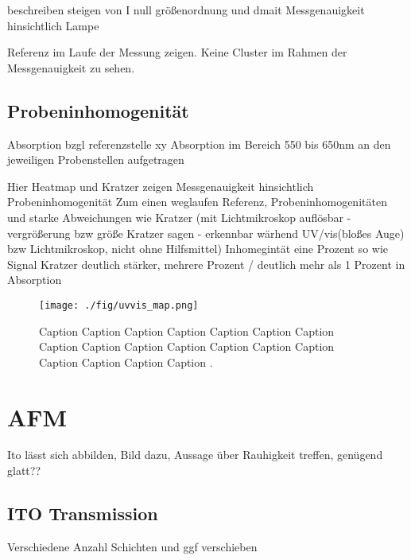 beschreiben steigen von I null
größenordnung und dmait Messgenauigkeit hinsichtlich Lampe







Referenz im Laufe der Messung zeigen.
Keine Cluster im Rahmen der Messgenauigkeit zu sehen.

\subsection{Probeninhomogenität}
Absorption bzgl referenzstelle xy 
Absorption im Bereich 550 bis 650nm an den jeweiligen Probenstellen aufgetragen


Hier Heatmap und Kratzer zeigen
Messgenauigkeit hinsichtlich Probeninhomogenität
Zum einen weglaufen Referenz, Probeninhomogenitäten und starke Abweichungen wie Kratzer (mit Lichtmikroskop auflösbar - vergrößerung bzw größe Kratzer sagen - erkennbar wärhend UV/vis(bloßes Auge) bzw Lichtmikroskop, nicht ohne Hilfsmittel)
Inhomegintät eine Prozent so wie Signal
Kratzer deutlich stärker, mehrere Prozent / deutlich mehr als 1 Prozent in Absorption

\begin{figure}
    \centering
    \texttt{[image: ./fig/uvvis\_map.png]}
    \caption{Caption Caption Caption Caption Caption Caption Caption Caption Caption Caption Caption Caption Caption Caption Caption Caption Caption Caption .}
    \label{fig:uvvis_map}
\end{figure}

\section{AFM}
Ito lässt sich abbilden, Bild dazu, Aussage über Rauhigkeit treffen, genügend glatt?? \


\subsection{ITO Transmission}

Verschiedene Anzahl Schichten und ggf verschieben

